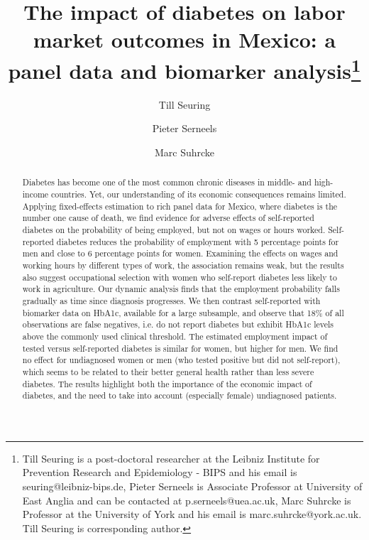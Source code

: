 \documentclass[12pt,english]{article}
\begin{document}
\title{The impact of diabetes on labor market outcomes in Mexico: a panel data and biomarker analysis\thanks{Till Seuring is a post-doctoral researcher at the Leibniz Institute for Prevention Research and Epidemiology - BIPS and his email is seuring@leibniz-bips.de,  Pieter Serneels is Associate Professor at University of East Anglia and can be contacted at p.serneels@uea.ac.uk, Marc Suhrcke is Professor at the University of York and his email is marc.suhrcke@york.ac.uk. Till Seuring is corresponding author.}}

\author[1,2]{Till Seuring}
\author[2]{Pieter Serneels}
\author[3]{Marc Suhrcke}






\maketitle 
\begin{abstract}
Diabetes has become one of the most common chronic diseases in middle- and high-income countries. Yet, our understanding of its economic consequences remains limited. Applying fixed-effects estimation to rich panel data for Mexico, where diabetes is the number one cause of death, we find evidence for adverse effects of self-reported diabetes on the probability of being employed, but not on wages or hours worked. Self-reported diabetes reduces the probability of employment with 5 percentage points for men and close to 6 percentage points for women.  Examining the effects on wages and working hours by different types of work, the association remains weak, but the results also suggest occupational selection with women who self-report diabetes less likely to work in agriculture.  Our dynamic analysis finds that the employment probability falls gradually as time since diagnosis progresses. We then contrast self-reported with biomarker data on \ac{HbA1c}, available for a large subsample, and observe that 18\% of all observations are false negatives, i.e. do not report diabetes but exhibit \ac{HbA1c} levels above the commonly used clinical threshold. The estimated employment impact of tested versus self-reported diabetes is similar for women, but higher for men. We find no effect for undiagnosed women or men (who tested positive but did not self-report), which seems to be related to their better general health rather than less severe diabetes. The results highlight both the importance of the economic impact of diabetes, and the need to take into account (especially female) undiagnosed patients.
\end{abstract}
\end{document}
